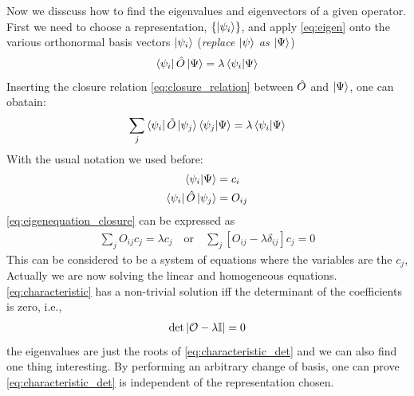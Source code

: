 Now we disscuss how to find the eigenvalues and eigenvectors of a given operator. First we need to choose a representation, $\{\ket{\psi_i}\}$, and apply \cref{eq:eigen} onto the various orthonormal basis vectors $\ket{\psi_i}$ (\emph{replace $\ket{\psi}$ as $\ket{\Psi}$}) 
\begin{eqnarray}
    \bra{\psi_i} \hat{O} \ket{\Psi} = \lambda \braket{\psi_i|\Psi}
\end{eqnarray}
Inserting the closure relation \cref{eq:closure_relation} between $\hat{O}$ and $\ket{\Psi}$, one can obatain: 
\begin{eqnarray}
    \sum_j \bra{\psi_i} \hat{O} \ket{\psi_j} \braket{\psi_j|\Psi} = \lambda \braket{\psi_i|\Psi}\label{eq:eigenequation_closure}
\end{eqnarray}
With the usual notation we used before: 
\begin{align}
    \braket{\psi_i|\Psi} &= c_i\\
    \bra{\psi_i} \hat{O} \ket{\psi_j} &= O_{ij}
\end{align}
\cref{eq:eigenequation_closure} can be expressed as 
\begin{eqnarray}
    \sum_j O_{ij} c_j = \lambda c_j \quad \text{or} \quad \sum_j \left[O_{ij} - \lambda \delta_{ij}\right] c_j = 0 \label{eq:characteristic}
\end{eqnarray}
This can be considered to be a system of equations where the variables are the $c_j$, Actually we are now solving the linear and homogeneous equations. \cref{eq:characteristic} has a non-trivial solution iff the determinant of the coefficients is zero, i.e., 
\begin{eqnarray}
    \det \left|\mathcal{O}- \lambda \mathbb{I}\right| = 0 \label{eq:characteristic_det}
\end{eqnarray}
the eigenvalues are just the roots of \cref{eq:characteristic_det} and we can also find one thing interesting. By performing an arbitrary change of basis, one can prove \cref{eq:characteristic_det} is independent of the representation chosen. 
